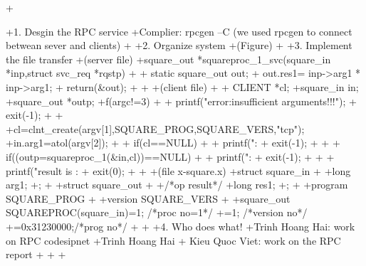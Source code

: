+\documentclass{article}
\begin{document}
+1. Desgin the RPC service
+Complier: rpcgen –C  (we used rpcgen to connect betwean sever and clients)
+
+2. Organize system
+(Figure) 
+ 
+3. Implement the file transfer
+(server file)
+square_out *squareproc_1_svc(square_in *inp,struct svc_req *rqstp)
+{
+    static square_out out;
+    out.res1= inp->arg1 * inp->arg1;
+   return(&out);
+}
+
+(client file)
+{
+    CLIENT *cl;
+square_in in;
+square_out *outp;
+f(argc!=3)
+    {
+          printf("\n\n error:insufficient arguments!!!");
+          exit(-1);
+    }
+
+cl=clnt_create(argv[1],SQUARE_PROG,SQUARE_VERS,"tcp");
+in.arg1=atol(argv[2]);
+
+    if(cl==NULL)
+    {
+          printf("\nerror:%
+          exit(-1);
+    }
+
+    if((outp=squareproc_1(&in,cl))==NULL)
+    {
+          printf("\nerror :%
+          exit(-1);
+    }
+
+    printf("\n\n result is : %
+    exit(0);
+}
+
+(file x-square.x)
+struct square_in
+{
+long arg1;
+};
+
+struct square_out
+{
+/*op result*/
+long res1;
+};
+
+program SQUARE_PROG
+{
+version SQUARE_VERS
+{
+square_out SQUAREPROC(square_in)=1; /*proc no=1*/
+}=1; /*version no*/
+}=0x31230000;/*prog no*/
+
+
+4. Who does what!
+Trinh Hoang Hai: work on RPC codesipnet
+Trinh Hoang Hai + Kieu Quoc Viet: work on the RPC report
+
+
+
\end{document}

